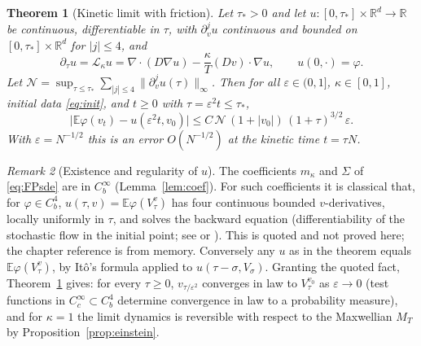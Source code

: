 \documentclass[11pt]{article}
\newcommand{\E}{\mathbb{E}}
\newcommand{\eps}{\varepsilon}
\newcommand{\cL}{\mathcal{L}}
\newcommand{\nrm}[2]{\|#1\|_{#2}}
\newtheorem{theorem}{Theorem}
\theoremstyle{remark}
\newtheorem{remark}[theorem]{Remark}
\begin{document}
\begin{theorem}[Kinetic limit with friction]\label{thm:kin}
Let $\tau_*>0$ and let $u:[0,\tau_*]\times\mathbb{R}^d\to\mathbb{R}$ be
continuous, differentiable in $\tau$, with $\partial_v^ju$ continuous and
bounded on $[0,\tau_*]\times\mathbb{R}^d$ for $|j|\le4$, and
\[
  \partial_\tau u=\cL_\kappa u
  =\nabla\cdot(D\nabla u)-\frac{\kappa}{T}(Dv)\cdot\nabla u,
  \qquad u(0,\cdot)=\varphi .
\]
Let $\mathcal{N}=\sup_{\tau\le\tau_*}\sum_{|j|\le4}\nrm{\partial_v^ju(\tau)}{\infty}$.
Then for all $\eps\in(0,1]$, $\kappa\in[0,1]$, initial data \eqref{eq:init},
and $t\ge0$ with $\tau=\eps^2t\le\tau_*$,
\begin{equation}
  \bigl|\E\varphi(v_t)-u(\eps^2t,v_0)\bigr|
  \le C\,\mathcal{N}\,(1+|v_0|)\,(1+\tau)^{3/2}\,\eps .
\end{equation}
With $\eps=N^{-1/2}$ this is an error $O(N^{-1/2})$ at the kinetic time
$t=\tau N$.
\end{theorem}

\begin{remark}[Existence and regularity of $u$]\label{rem:reg}
The coefficients $m_\kappa$ and $\Sigma$ of \eqref{eq:FPsde} are in
$C_b^\infty$ (Lemma~\ref{lem:coef}). For such coefficients it is classical
that, for $\varphi\in C_b^4$, $u(\tau,v)=\E\varphi(V_\tau^v)$ has four
continuous bounded $v$-derivatives, locally uniformly in $\tau$, and solves
the backward equation (differentiability of the stochastic flow in the
initial point; see \cite[Ch.~5]{Friedman} or \cite{Kunita}). This is quoted
and not proved here; the chapter reference is from memory. Conversely any
$u$ as in the theorem equals $\E\varphi(V_\tau^v)$, by It\^o's formula
applied to $u(\tau-\sigma,V_\sigma)$. Granting the quoted fact,
Theorem~\ref{thm:kin} gives: for every $\tau\ge0$, $v_{\tau/\eps^2}$
converges in law to $V_\tau^{v_0}$ as $\eps\to0$ (test functions in
$C_c^\infty\subset C_b^4$ determine convergence in law to a probability
measure), and for $\kappa=1$ the limit dynamics is reversible with respect
to the Maxwellian $M_T$ by Proposition~\ref{prop:einstein}.
\end{remark}
\end{document}
